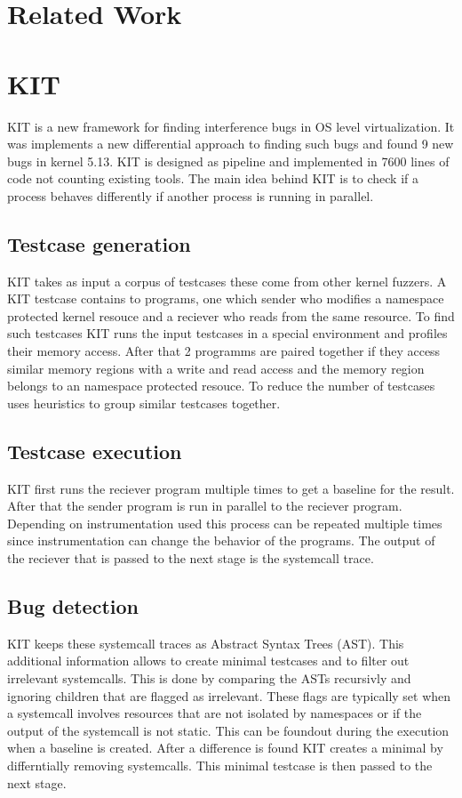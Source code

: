 \documentclass[10pt,twocolumn,a4paper]{article}
\begin{document}
\section{Related Work}\label{sec:relwork} 
\section{KIT}
KIT is a new framework for finding interference bugs in OS level virtualization\cite{0}. It was
implements a new differential approach to finding such bugs and found 9 new bugs in kernel 5.13\cite{2}.
KIT is designed as pipeline and implemented in 7600 lines of code not counting existing tools\cite{0}.
The main idea behind KIT is to check if a process behaves differently if another process is running
in parallel.
\subsection{Testcase generation}
KIT takes as input a corpus of testcases these come from other kernel fuzzers.
A KIT testcase contains to programs, one which sender who modifies a namespace protected kernel
resouce and a reciever who reads from the same resource. To find such testcases
KIT runs the input testcases in a special environment and profiles their memory access. 
After that 2 programms are paired together if they access similar memory regions with a write and
read access and the memory region belongs to an namespace protected resouce.
To reduce the number of testcases uses heuristics to group similar testcases together.


\subsection{Testcase execution}
KIT first runs the reciever program multiple times to get a baseline for the result. After that
the sender program is run in parallel to the reciever program. Depending on instrumentation used
this process can be repeated multiple times since instrumentation can change the behavior of the
programs. The output of the reciever that is passed to the next stage is the systemcall trace.
\subsection{Bug detection}
KIT keeps these systemcall traces as Abstract Syntax Trees (AST). This additional information allows 
to create minimal testcases and to filter out irrelevant systemcalls. This is done by comparing the ASTs
recursivly and ignoring children that are flagged as irrelevant. These flags are typically set when
a systemcall involves resources that are not isolated by namespaces or if the output of the
systemcall is not static. This can be foundout during the execution when a baseline is created.
After a difference is found KIT creates a minimal by differntially removing systemcalls. This
minimal testcase is then passed to the next stage.
\end{document}
